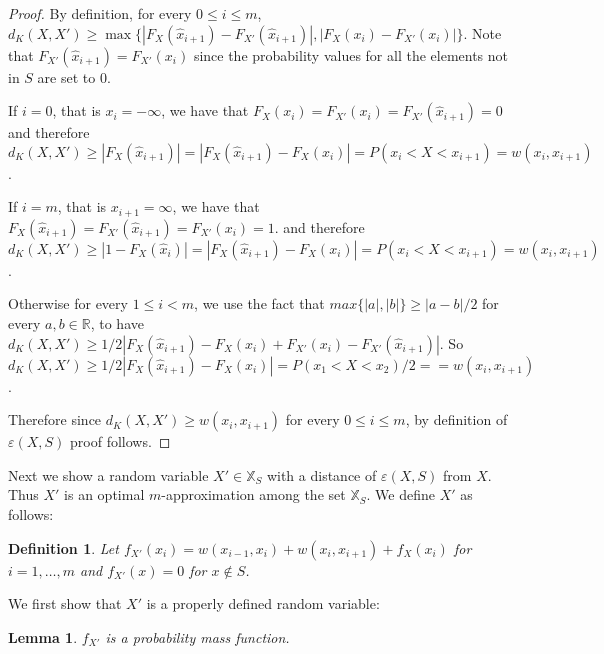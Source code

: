 \documentclass{article}
\newtheorem{lemma}[thm]{Lemma}
\newtheorem{definition}[thm]{Definition}
\begin{document}
\begin{proof}
	
	
	By definition, for every $0\leq i\leq m$, $d_K(X,X') \geq \max \{|F_X(\hat x_{i+1}) - F_{X'}(\hat x_{i+1})|,|F_X(x_i) - F_{X'}(x_i)| \}$. Note that $F_{X'}(\hat x_{i+1})=F_{X'}(x_i)$ since the probability values for all the elements not in $S$ are set to $0$.
	
	If $i=0$, that is $x_i=-\infty$, we have that $F_X(x_i)=F_{X'}(x_i)=F_{X'}(\hat x_{i+1})=0$ and therefore $d_K(X,X') \geq |F_X(\hat x_{i+1})| = |F_X(\hat x_{i+1}) - F_{X}(x_i)| =  P(x_i < X < x_{i+1})= w(x_i,x_{i+1})$.
	
	If $i =m$, that is $x_{i+1}=\infty$, we have that $F_X(\hat x_{i+1})=F_{X'}(\hat x_{i+1})=F_{X'}(x_i)=1$. 
	and therefore $d_K(X,X') \geq |1-F_X(\hat x_i)| = |F_X(\hat x_{i+1}) - F_{X}(x_i)| =  P(x_i < X < x_{i+1}) = w(x_i,x_{i+1})$. 
	
	
	Otherwise for every $1\leq i< m$,  we use the fact that $max\{|a|,|b|\} \geq |a-b|/2$ for every $a,b\in\mathbb{R}$, to have $d_K(X,X') \geq 1/2| F_X(\hat x_{i+1}) - F_X(x_i) + F_{X'}(x_i) -F_{X'}(\hat x_{i+1})|$. So $d_K(X,X') \geq 1/2| F_X(\hat x_{i+1}) - F_X(x_i) | =P(x_1 < X < x_2)/2 == w(x_i,x_{i+1})$. 
	
	Therefore since $d_K(X,X') \geq  w(x_i,x_{i+1})$ for every $0\leq i\leq m$, by definition of $\varepsilon(X,S)$ proof follows.
\end{proof}



Next we show a random variable $X'\in\mathbb{X}_S$ with a distance of $\varepsilon(X,S)$ from $X$. Thus $X'$ is an optimal $m$-approximation among the set $\mathbb{X}_S$. We define $X'$ as follows:

\begin{definition}\label{def:construction}
	Let $f_{X'}(x_{i}) = w(x_{i-1},x_i) + w(x_i,x_{i+1}) + f_{X}(x_i)$ for $i=1,\dots,m$ and $f_{X'}(x)=0$ for $x \notin S$.
\end{definition}

We first show that $X'$ is a properly defined random variable:

\begin{lemma}
	$f_{X'}$ is a probability mass function. 
\end{lemma}
\end{document}
